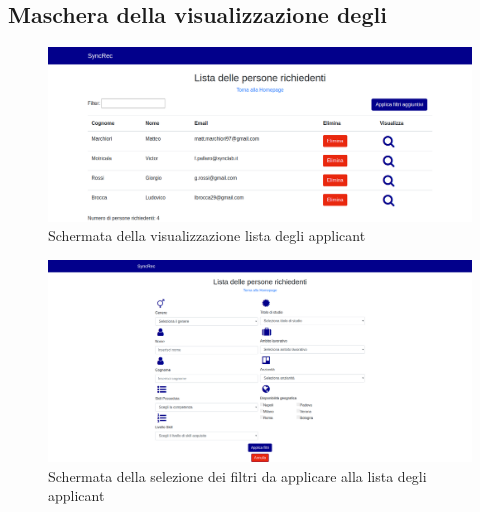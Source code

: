 \subsection{Maschera della visualizzazione degli\applicant}

\vspace{0.5em}
\begin{figure}[!h] 
	\centering 
	\includegraphics[width=1\columnwidth]{immagini/svil/lista} 
	\caption{Schermata della visualizzazione lista degli applicant}
	\label{figura:lista}
\end{figure}


\vspace{0.5em}
\begin{figure}[!h] 
	\centering 
	\includegraphics[width=1\columnwidth]{immagini/svil/filtri} 
	\caption{Schermata della selezione dei filtri da applicare alla lista degli applicant}
	\label{figura:filtri}
\end{figure}

